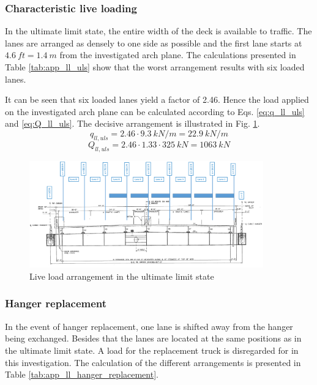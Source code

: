\subsubsection{Characteristic live loading} \label{Appendx_A_Live_loading_1}
In the ultimate limit state, the entire width of the deck is available to traffic. The lanes are arranged as densely to one side as possible and the first lane starts at $\SI{4.6}{ft}=\SI{1.4}{m}$ from the investigated arch plane. The calculations presented in Table \ref{tab:app_ll_uls} show that the worst arrangement results with six loaded lanes. 



It can be seen that six loaded lanes yield a factor of 2.46. Hence the load applied on the investigated arch plane can be calculated according to Eqs. \eqref{eq:q_ll_uls} and \eqref{eq:Q_ll_uls}. The decisive arrangement is illustrated in Fig. \ref{fig:app_hangers_uls}.
\begin{equation}
    q_{ll, uls} = 2.46 \cdot \SI{9.3}{kN/m} = \SI{22.9}{kN/m}
    \label{eq:q_ll_uls}
\end{equation}
\begin{equation}
    Q_{ll, uls} = 2.46 \cdot 1.33 \cdot \SI{325}{kN} = \SI{1063}{kN}
    \label{eq:Q_ll_uls}
\end{equation}

\begin{figure}[H]
    \centering
    \includegraphics[width=0.9\textwidth]{overleaf/Appendix/Pictures/Cross_Section_LL_ULS.PNG}
    \caption{Live load arrangement in the ultimate limit state}
    \label{fig:app_hangers_uls}
\end{figure}




\subsubsection{Hanger replacement} \label{Appendx_A_Live_loading_2}
In the event of hanger replacement, one lane is shifted away from the hanger being exchanged. Besides that the lanes are located at the same positions as in the ultimate limit state. A load for the replacement truck is disregarded for in this investigation. The calculation of the different arrangements is presented in Table \ref{tab:app_ll_hanger_replacement}.


